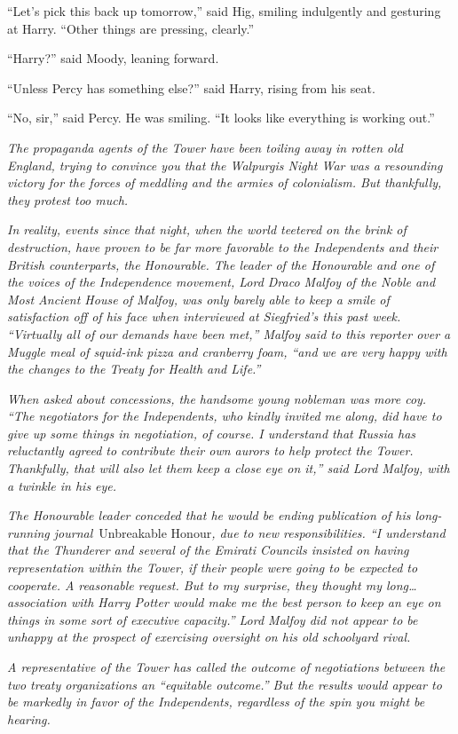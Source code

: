 ``Let's pick this back up tomorrow,'' said Hig, smiling indulgently and
gesturing at Harry. ``Other things are pressing, clearly.''

``Harry?'' said Moody, leaning forward.

``Unless Percy has something else?'' said Harry, rising from his seat.

``No, sir,'' said Percy. He was smiling. ``It looks like everything is
working out.''

\mybreak

\emph{The propaganda agents of the Tower have been toiling away in
rotten old England, trying to convince you that the Walpurgis Night War
was a resounding victory for the forces of meddling and the armies of
colonialism. But thankfully, they protest too much.}

\emph{In reality, events since that night, when the world teetered on
the brink of destruction, have proven to be far more favorable to the
Independents and their British counterparts, the Honourable. The leader
of the Honourable and one of the voices of the Independence movement,
Lord Draco Malfoy of the Noble and Most Ancient House of Malfoy, was
only barely able to keep a smile of satisfaction off of his face when
interviewed at Siegfried's this past week. ``Virtually all of our
demands have been met,'' Malfoy said to this reporter over a Muggle meal
of squid-ink pizza and cranberry foam, ``and we are very happy with the
changes to the Treaty for Health and Life.''}

\emph{When asked about concessions, the handsome young nobleman was more
coy. ``The negotiators for the Independents, who kindly invited me
along, did have to give up some things in negotiation, of course. I
understand that Russia has reluctantly agreed to contribute their own
aurors to help protect the Tower. Thankfully, that will also let them
keep a close eye on it,'' said Lord Malfoy, with a twinkle in his eye.}

\emph{The Honourable leader conceded that he would be ending publication
of his long-running journal}~Unbreakable Honour\emph{, due to new
responsibilities. ``I understand that the Thunderer and several of the
Emirati Councils insisted on having representation within the Tower, if
their people were going to be expected to cooperate. A reasonable
request. But to my surprise, they thought my long\ldots{} association
with Harry Potter would make me the best person to keep an eye on things
in some sort of executive capacity.'' Lord Malfoy did not appear to be
unhappy at the prospect of exercising oversight on his old schoolyard
rival.}

\emph{A representative of the Tower has called the outcome of
negotiations between the two treaty organizations an ``equitable
outcome.'' But the results would appear to be markedly in favor of the
Independents, regardless of the spin you might be hearing.}

